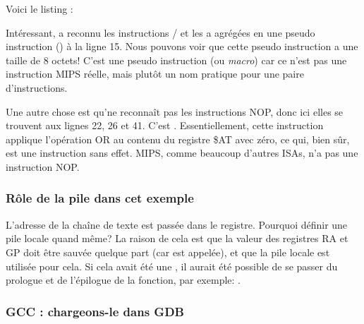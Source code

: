 Voici le listing \IDA:




Intéressant, \IDA a reconnu les instructions / et les a agrégées
en une pseudo instruction  () à la ligne 15.
Nous pouvons voir que cette pseudo instruction a une taille de 8 octets!
C'est une pseudo instruction (ou \emph{macro}) car ce n'est pas une instruction MIPS
réelle, mais plutôt un nom pratique pour une paire d'instructions.


Une autre chose est qu'\IDA ne reconnaît pas les instructions \ac{NOP}, donc ici
elles se trouvent aux lignes 22, 26 et 41.
C'est .
Essentiellement, cette instruction applique l'opération OR au contenu du registre
\$AT avec zéro, ce qui, bien sûr, est une instruction sans effet.
MIPS, comme beaucoup d'autres \ac{ISA}s, n'a pas une instruction \ac{NOP}.

\subsubsection{Rôle de la pile dans cet exemple}

L'adresse de la chaîne de texte est passée dans le registre.
Pourquoi définir une pile locale quand même?
La raison de cela est que la valeur des registres \ac{RA} et GP doit être sauvée
quelque part (car \printf est appelée), et que la pile locale est utilisée pour cela.
Si cela avait été une , il aurait été
possible de se passer du prologue et de l'épilogue de la fonction, par
exemple: .

\subsubsection{GCC \Optimizing: chargeons-le dans GDB}



